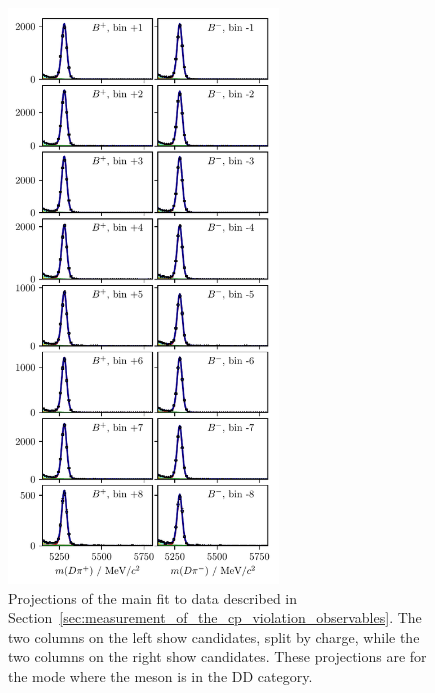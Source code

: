 \begin{figure}[tp]
    \includegraphics[height=6in]{figures/analysis/bin_by_bin/pretty_fit_bins_dpi_DD_2.pdf}
    \caption{Projections of the main fit to data described in Section~\ref{sec:measurement_of_the_cp_violation_observables}. The two columns on the left show \BtoDK candidates, split by charge, while the two columns on the right show \BtoDpi candidates. These projections are for the \DtoKspp mode where the \KS meson is in the DD category.}
\end{figure}

